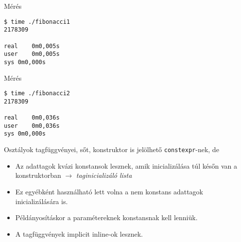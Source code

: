 \documentclass[usenames,dvipsnames,aspectratio=169]{beamer}
\begin{document}
\begin{frame}[fragile]
    \begin{exampleblock}{}
        \scriptsize
        \vspace{-.2cm}
        
        \vspace{-.2cm}
    \end{exampleblock}
    \begin{block}{Mérés}
        \vspace{-.4cm}
        \scriptsize
        \begin{verbatim}
$ time ./fibonacci1
2178309

real	0m0,005s
user	0m0,005s
sys	0m0,000s    
\end{verbatim}
        \vspace{-.4cm}
    \end{block}
\end{frame}

\begin{frame}[fragile]
    \begin{exampleblock}{}
        \scriptsize
        \vspace{-.2cm}
        
        \vspace{-.2cm}
    \end{exampleblock}
    \begin{block}{Mérés}
        \vspace{-.4cm}
        \scriptsize
        \begin{verbatim}
$ time ./fibonacci2
2178309

real	0m0,036s
user	0m0,036s
sys	0m0,000s            
\end{verbatim}
        \vspace{-.4cm}
    \end{block}
\end{frame}

\begin{frame}
    Osztályok tagfüggvényei, sőt, konstruktor is jelölhető \texttt{constexpr}-nek, de
    \begin{itemize}
        \item Az adattagok kvázi konstansok lesznek, amik inicializálása túl későn van a konstruktorban $\to$ \emph{taginicializáló lista}
        \item Ez egyébként használható lett volna a nem konstans adattagok inicializálására is.
        \item Példányosításkor a paramétereknek konstansnak kell lenniük.
        \item A tagfüggvények implicit inline-ok lesznek.
    \end{itemize}
\end{frame}
\end{document}

